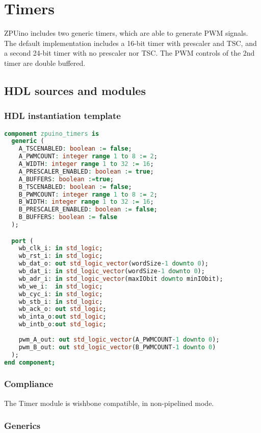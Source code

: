 \section{Timers}
ZPUino includes two generic timers, which are able to generate PWM signals. 
The default implementation includes a 16-bit timer with prescaler and TSC, and a second 24-bit timer with no prescaler nor TSC.
The PWM controls of the 2nd timer are double buffered.

\subsection{HDL sources and modules}

\subsubsection{HDL instantiation template}
\begin{lstlisting}[language=VHDL]
component zpuino_timers is
  generic (
    A_TSCENABLED: boolean := false;
    A_PWMCOUNT: integer range 1 to 8 := 2;
    A_WIDTH: integer range 1 to 32 := 16;
    A_PRESCALER_ENABLED: boolean := true;
    A_BUFFERS: boolean :=true;
    B_TSCENABLED: boolean := false;
    B_PWMCOUNT: integer range 1 to 8 := 2;
    B_WIDTH: integer range 1 to 32 := 16;
    B_PRESCALER_ENABLED: boolean := false;
    B_BUFFERS: boolean := false
  );

  port (
    wb_clk_i: in std_logic;
    wb_rst_i: in std_logic;
    wb_dat_o: out std_logic_vector(wordSize-1 downto 0);
    wb_dat_i: in std_logic_vector(wordSize-1 downto 0);
    wb_adr_i: in std_logic_vector(maxIObit downto minIObit);
    wb_we_i:  in std_logic;
    wb_cyc_i: in std_logic;
    wb_stb_i: in std_logic;
    wb_ack_o: out std_logic;
    wb_inta_o:out std_logic;
    wb_intb_o:out std_logic;
    
    pwm_A_out: out std_logic_vector(A_PWMCOUNT-1 downto 0);
    pwm_B_out: out std_logic_vector(B_PWMCOUNT-1 downto 0)
  );
end component;
\end{lstlisting}

\subsubsection{Compliance}
The Timer module is wishbone compatible, in non-pipelined mode.

\subsubsection{Generics}

